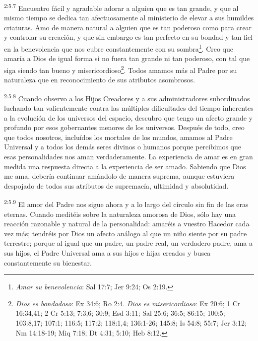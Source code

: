 \par
\textsuperscript{2:5.7} Encuentro fácil y agradable adorar a alguien que es tan grande, y que al mismo tiempo se dedica tan afectuosamente al ministerio de elevar a sus humildes criaturas. Amo de manera natural a alguien que es tan poderoso como para crear y controlar su creación, y que sin embargo es tan perfecto en su bondad y tan fiel en la benevolencia que nos cubre constantemente con su sombra\footnote{\textit{Amar su benevolencia}: Sal 17:7; Jer 9:24; Os 2:19.}. Creo que amaría a Dios de igual forma si no fuera tan grande ni tan poderoso, con tal que siga siendo tan bueno y misericordioso\footnote{\textit{Dios es bondadoso}: Ex 34:6; Ro 2:4. \textit{Dios es misericordioso}: Ex 20:6; 1 Cr 16:34,41; 2 Cr 5:13; 7:3,6; 30:9; Esd 3:11; Sal 25:6; 36:5; 86:15; 100:5; 103:8,17; 107:1; 116:5; 117:2; 118:1,4; 136:1-26; 145:8; Is 54:8; 55:7; Jer 3:12; Nm 14:18-19; Miq 7:18; Dt 4:31; 5:10; Heb 8:12.}. Todos amamos más al Padre por su naturaleza que en reconocimiento de sus atributos asombrosos.

\par
\textsuperscript{2:5.8} Cuando observo a los Hijos Creadores y a sus administradores subordinados luchando tan valientemente contra las múltiples dificultades del tiempo inherentes a la evolución de los universos del espacio, descubro que tengo un afecto grande y profundo por esos gobernantes menores de los universos. Después de todo, creo que todos nosotros, incluídos los mortales de los mundos, amamos al Padre Universal y a todos los demás seres divinos o humanos porque percibimos que esas personalidades nos aman verdaderamente. La experiencia de amar es en gran medida una respuesta directa a la experiencia de ser amado. Sabiendo que Dios me ama, debería continuar amándolo de manera suprema, aunque estuviera despojado de todos sus atributos de supremacía, ultimidad y absolutidad.

\par
\textsuperscript{2:5.9} El amor del Padre nos sigue ahora y a lo largo del círculo sin fin de las eras eternas. Cuando meditéis sobre la naturaleza amorosa de Dios, sólo hay una reacción razonable y natural de la personalidad: amaréis a vuestro Hacedor cada vez más; tendréis por Dios un afecto análogo al que un niño siente por su padre terrestre; porque al igual que un padre, un padre real, un verdadero padre, ama a sus hijos, el Padre Universal ama a sus hijos e hijas creados y busca constantemente su bienestar.

